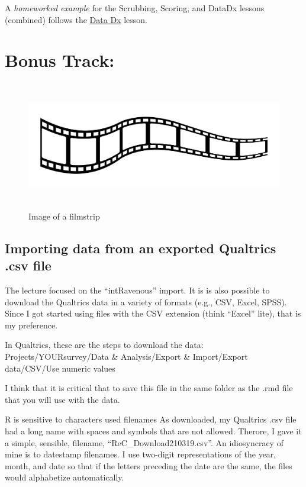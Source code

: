 \documentclass[
  11pt,
]{book}
\begin{document}
A \emph{homeworked example} for the Scrubbing, Scoring, and DataDx lessons (combined) follows the \protect\hyperlink{DataDx}{Data Dx} lesson.

\hypertarget{bonus-track}{%
\section{Bonus Track:}\label{bonus-track}}

\begin{figure}
\hypertarget{id}{%
\centering
\includegraphics[width=6.45833in,height=2.19792in]{images/film-strip-1.jpg}
\caption{Image of a filmstrip}\label{id}
}
\end{figure}

\hypertarget{importing-data-from-an-exported-qualtrics-.csv-file}{%
\subsection{Importing data from an exported Qualtrics .csv file}\label{importing-data-from-an-exported-qualtrics-.csv-file}}

The lecture focused on the ``intRavenous'' import. It is is also possible to download the Qualtrics data in a variety of formats (e.g., CSV, Excel, SPSS). Since I got started using files with the CSV extension (think ``Excel'' lite), that is my preference.

In Qualtrics, these are the steps to download the data: Projects/YOURsurvey/Data \& Analysis/Export \& Import/Export data/CSV/Use numeric values

I think that it is critical that to save this file in the same folder as the .rmd file that you will use with the data.

R is sensitive to characters used filenames As downloaded, my Qualtrics .csv file had a long name with spaces and symbols that are not allowed. Therore, I gave it a simple, sensible, filename, ``ReC\_Download210319.csv''. An idiosyncracy of mine is to datestamp filenames. I use two-digit representations of the year, month, and date so that if the letters preceding the date are the same, the files would alphabetize automatically.
\end{document}
